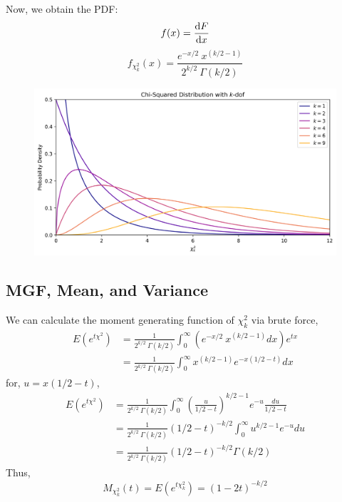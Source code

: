 \documentclass[12pt]{article}
\numberwithin{equation}{section}
\theoremstyle{definition}
\begin{document}
Now, we obtain the PDF:
\begin{equation}
		f(x) = \dv{F}{x} 
\end{equation}
\begin{equation}
		f_{\chi^2_k}(x) = \frac{e^{-x/2}\ x^{(k/2-1)}}{2^{k/2}\ \Gamma(k/2)} 
\end{equation}

\begin{figure}[H]
	\centering
	\includegraphics[width=17cm] {pdf}
\end{figure}

\subsection{MGF, Mean, and Variance}

We can calculate the moment generating function of $\chi^2_k$ via brute force,
\begin{align}
		E(e^{t\chi^2}) &= \frac{1}{2^{k/2}\ \Gamma(k/2)}\int_0^{\infty} \left(e^{-x/2}\ x^{(k/2-1)} dx\right) e^{tx}\\
		&=  \frac{1}{2^{k/2}\ \Gamma(k/2)} \int_0^{\infty} x^{(k/2-1)} e^{-x(1/2-t)}dx
\end{align}
for, $u = x(1/2-t)$,
\begin{align}
		E(e^{t\chi^2}) &= \frac{1}{2^{k/2}\ \Gamma(k/2)} \int_0^{\infty} \left(\frac{u}{1/2-t}\right)^{k/2-1}e^{-u} \frac{du}{1/2-t}\\
		&=  \frac{1}{2^{k/2}\ \Gamma(k/2)} \left(1/2-t\right)^{-k/2} \int_0^{\infty} u^{k/2-1}e^{-u}du\\
		&=  \frac{1}{2^{k/2}\ \Gamma(k/2)} \left(1/2-t\right)^{-k/2} \Gamma(k/2)
\end{align}
Thus,
\begin{equation}
		M_{\chi_k^2}(t) = E(e^{t\chi_k^2}) = (1-2t)^{-k/2}
\end{equation}
\end{document}

